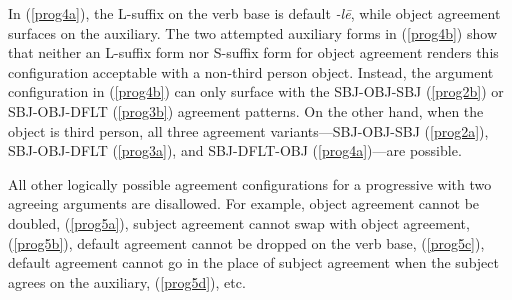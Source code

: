 \documentclass[output=paper
,modfonts
,nonflat]{langsci/langscibook}
\begin{document}
\noindent In (\ref{prog4a}), the L-suffix on the verb base is default \textit{-l\=e}, while object agreement surfaces on the auxiliary. The two attempted auxiliary forms in (\ref{prog4b}) show that neither an L-suffix form nor S-suffix form for object agreement renders this configuration acceptable with a non-third person object. Instead, the argument configuration in (\ref{prog4b}) can only surface with the SBJ-OBJ-SBJ (\ref{prog2b}) or SBJ-OBJ-DFLT (\ref{prog3b}) agreement patterns. On the other hand, when the object is third person, all three agreement variants---SBJ-OBJ-SBJ (\ref{prog2a}), SBJ-OBJ-DFLT (\ref{prog3a}), and SBJ-DFLT-OBJ (\ref{prog4a})---are possible.

All other logically possible agreement configurations for a progressive with two agreeing arguments are disallowed. For example, object agreement cannot be doubled, (\ref{prog5a}), subject agreement cannot swap with object agreement, (\ref{prog5b}), default agreement cannot be dropped on the verb base, (\ref{prog5c}), default agreement cannot go in the place of subject agreement when the subject agrees on the auxiliary, (\ref{prog5d}), etc.

\eal \label{prog5}
\zl

\end{document}
